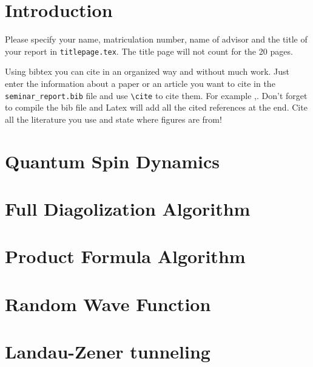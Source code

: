 \documentclass[twoside,a4paper,article]{combine}
\begin{document}


\begin{abstract}
\end{abstract}

\tableofcontents
\newpage


\section{Introduction}

Please specify your name, matriculation number, name of advisor and the title of your report in \linebreak
\verb+titlepage.tex+.
The title page will not count for the 20 pages.

Using bibtex you can cite in an organized way and without much work.
Just enter the information about a paper or an article you want to cite in the \verb+seminar_report.bib+ file and use \verb+\cite+ to cite them. For example \cite{Author08CVPR},\cite{Author04IJCV}.
Don't forget to compile the bib file and Latex will add all the cited references at the end.
Cite all the literature you use and state where figures are from!

\section{Quantum Spin Dynamics}

\section{Full Diagolization Algorithm}

\section{Product Formula Algorithm}

\section{Random Wave Function}

\section{Landau-Zener tunneling}
\end{document}
